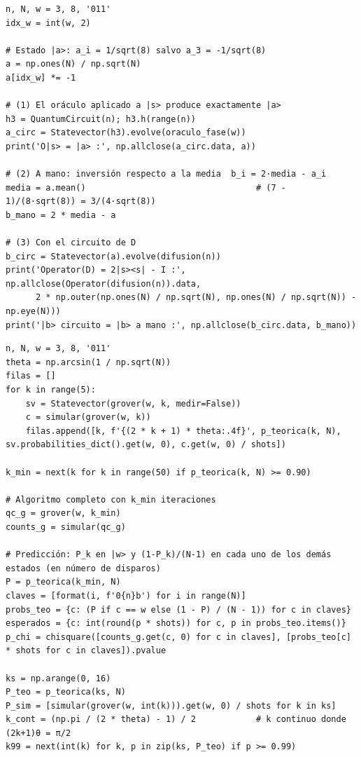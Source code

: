 \begin{lstlisting}[caption={Ejercicio 4.1: comprobación del oráculo, de la inversión respecto a la media y del circuito de $D$.},label={lst:b4_41}]
n, N, w = 3, 8, '011'
idx_w = int(w, 2)

# Estado |a>: a_i = 1/sqrt(8) salvo a_3 = -1/sqrt(8)
a = np.ones(N) / np.sqrt(N)
a[idx_w] *= -1

# (1) El oráculo aplicado a |s> produce exactamente |a>
h3 = QuantumCircuit(n); h3.h(range(n))
a_circ = Statevector(h3).evolve(oraculo_fase(w))
print('O|s> = |a> :', np.allclose(a_circ.data, a))

# (2) A mano: inversión respecto a la media  b_i = 2·media - a_i
media = a.mean()                                  # (7 - 1)/(8·sqrt(8)) = 3/(4·sqrt(8))
b_mano = 2 * media - a

# (3) Con el circuito de D
b_circ = Statevector(a).evolve(difusion(n))
print('Operator(D) = 2|s><s| - I :', np.allclose(Operator(difusion(n)).data,
      2 * np.outer(np.ones(N) / np.sqrt(N), np.ones(N) / np.sqrt(N)) - np.eye(N)))
print('|b> circuito = |b> a mano :', np.allclose(b_circ.data, b_mano))
\end{lstlisting}

\begin{lstlisting}[caption={Ejercicios 4.2 y 4.3: probabilidad de éxito frente a $k$, mínimo $k$ con el $90\%$ y primer $k$ con el $99\%$.},label={lst:b4_42}]
n, N, w = 3, 8, '011'
theta = np.arcsin(1 / np.sqrt(N))
filas = []
for k in range(5):
    sv = Statevector(grover(w, k, medir=False))
    c = simular(grover(w, k))
    filas.append([k, f'{(2 * k + 1) * theta:.4f}', p_teorica(k, N), sv.probabilities_dict().get(w, 0), c.get(w, 0) / shots])

k_min = next(k for k in range(50) if p_teorica(k, N) >= 0.90)

# Algoritmo completo con k_min iteraciones
qc_g = grover(w, k_min)
counts_g = simular(qc_g)

# Predicción: P_k en |w> y (1-P_k)/(N-1) en cada uno de los demás estados (en número de disparos)
P = p_teorica(k_min, N)
claves = [format(i, f'0{n}b') for i in range(N)]
probs_teo = {c: (P if c == w else (1 - P) / (N - 1)) for c in claves}
esperados = {c: int(round(p * shots)) for c, p in probs_teo.items()}
p_chi = chisquare([counts_g.get(c, 0) for c in claves], [probs_teo[c] * shots for c in claves]).pvalue

ks = np.arange(0, 16)
P_teo = p_teorica(ks, N)
P_sim = [simular(grover(w, int(k))).get(w, 0) / shots for k in ks]
k_cont = (np.pi / (2 * theta) - 1) / 2            # k continuo donde (2k+1)θ = π/2
k99 = next(int(k) for k, p in zip(ks, P_teo) if p >= 0.99)
\end{lstlisting}

